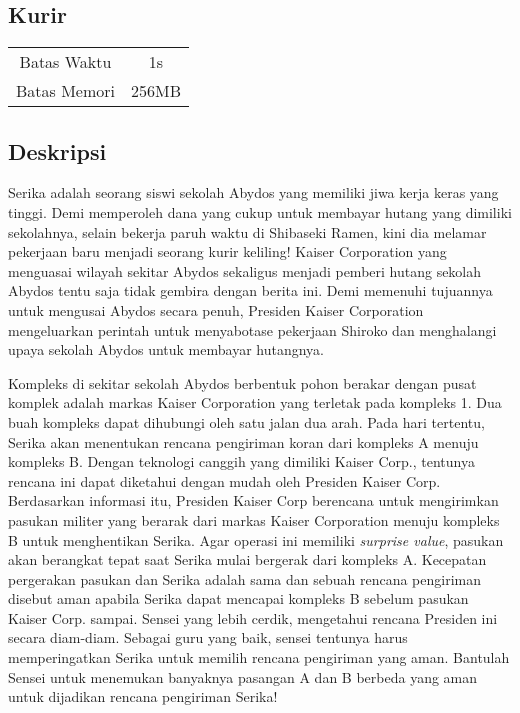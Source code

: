 \documentclass{article}
\begin{document}
\begin{center}

    
    \section*{Kurir} %

    \begin{tabular}{ | c c | }
        \hline
        Batas Waktu  & 1s \\    %
        Batas Memori & 256MB \\  %
        \hline
    \end{tabular}
\end{center}

\subsection*{Deskripsi}

Serika adalah seorang siswi sekolah Abydos yang memiliki jiwa kerja keras yang tinggi. Demi memperoleh dana yang cukup untuk membayar hutang yang dimiliki sekolahnya, selain bekerja paruh waktu di Shibaseki Ramen, kini dia melamar pekerjaan baru menjadi seorang kurir keliling! Kaiser Corporation yang menguasai wilayah sekitar Abydos sekaligus menjadi pemberi hutang sekolah Abydos tentu saja tidak gembira dengan berita ini. Demi memenuhi tujuannya untuk mengusai Abydos secara penuh, Presiden Kaiser Corporation mengeluarkan perintah untuk menyabotase pekerjaan Shiroko dan menghalangi upaya sekolah Abydos untuk membayar hutangnya.

Kompleks di sekitar sekolah Abydos berbentuk pohon berakar dengan pusat komplek adalah markas Kaiser Corporation yang terletak pada kompleks 1. Dua buah kompleks dapat dihubungi oleh satu jalan dua arah. Pada hari tertentu, Serika akan menentukan rencana pengiriman koran dari kompleks A menuju kompleks B. Dengan teknologi canggih yang dimiliki Kaiser Corp., tentunya rencana ini dapat diketahui dengan mudah oleh Presiden Kaiser Corp. Berdasarkan informasi itu, Presiden Kaiser Corp berencana untuk mengirimkan pasukan militer yang berarak dari markas Kaiser Corporation menuju kompleks B untuk menghentikan Serika. Agar operasi ini memiliki \textit{surprise value}, pasukan akan berangkat tepat saat Serika mulai bergerak dari kompleks A. Kecepatan pergerakan pasukan dan Serika adalah sama dan sebuah rencana pengiriman disebut aman apabila Serika dapat mencapai kompleks B sebelum pasukan Kaiser Corp. sampai. Sensei yang lebih cerdik, mengetahui rencana Presiden ini secara diam-diam. Sebagai guru yang baik, sensei tentunya harus memperingatkan Serika untuk memilih rencana pengiriman yang aman. Bantulah Sensei untuk menemukan banyaknya pasangan A dan B berbeda yang aman untuk dijadikan rencana pengiriman Serika!
\end{document}
